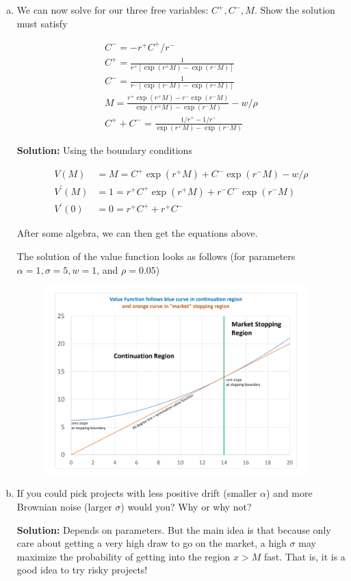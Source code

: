 \documentclass[11pt]{extarticle}
\theoremstyle{plain}
\theoremstyle{definition}
\begin{document}
\begin{enumerate}[(a)]
\item  We can now solve for our three free variables:  $C^{+}, C^{-}, M $. Show the solution must satisfy 

$$
\begin{gathered}
C^{-}=-r^{+} C^{+} / r^{-} \\
C^{+}=\frac{1}{r^{+}\left[\exp \left(r^{+} M\right)-\exp \left(r^{-} M\right)\right]} \\
C^{-}=\frac{1}{r^{-}\left[\exp \left(r^{-} M\right)-\exp \left(r^{+} M\right)\right]} \\
M=\frac{r^{+} \exp \left(r^{+} M\right)-r^{-} \exp \left(r^{-} M\right)}{\exp \left(r^{+} M\right)-\exp \left(r^{-} M\right)}-w / \rho \\
C^{+}+C^{-}=\frac{1 / r^{+}-1 / r^{-}}{\exp \left(r^{+} M\right)-\exp \left(r^{-} M\right)}
\end{gathered}
$$

\textbf{Solution:} Using the boundary conditions 

$$
\begin{aligned}
V(M) &=M=C^{+} \exp \left(r^{+} M\right)+C^{-} \exp \left(r^{-} M\right)-w / \rho \\
V^{\prime}(M) &=1=r^{+} C^{+} \exp \left(r^{+} M\right)+r^{-} C^{-} \exp \left(r^{-} M\right) \\
V^{\prime}(0) &=0=r^{+} C^{+}+r^{+} C^{-}
\end{aligned}
$$

After some algebra, we can then get the equations above.


The solution of the value function looks as follows (for parameters $\alpha=1, \sigma=5, w=1$, and $\rho=0.05$)

     \begin{figure}[htp]
    \centering
    \includegraphics[width=10.2cm]{plot_value_market.png}
    \end{figure}

\item  If you could pick projects with less positive drift (smaller $\alpha$) and more
Brownian noise (larger $\sigma$) would you? Why or why not?

\textbf{Solution:} Depends on parameters. But the main idea is that because only care about getting a very high draw to go on the market, a high  $\sigma$ may maximize the probability of getting into the region $x>M$ fast.  That is, it is a good idea to try risky projects!

\end{enumerate}
\end{document}
